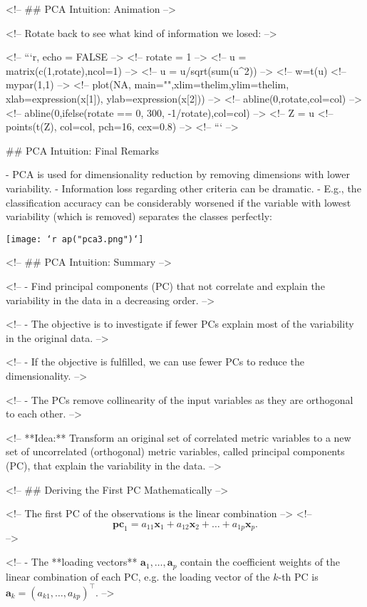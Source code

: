{{{{<!-- ## PCA Intuition: Animation -->

<!-- Rotate back to see what kind of information we losed: -->

<!-- ```{r, echo = FALSE} -->
<!-- rotate = 1 -->
<!-- u = matrix(c(1,rotate),ncol=1) -->
<!-- u = u/sqrt(sum(u^2)) -->
<!-- w=t(u)%
<!-- mypar(1,1) -->
<!-- plot(NA, main="",xlim=thelim,ylim=thelim, xlab=expression(x[1]), ylab=expression(x[2])) -->
<!-- abline(0,rotate,col=col) -->
<!-- abline(0,ifelse(rotate == 0, 300, -1/rotate),col=col) -->
<!-- Z = u%
<!-- points(t(Z), col=col, pch=16, cex=0.8) -->
<!-- ``` -->

## PCA Intuition: Final Remarks

- PCA is used for dimensionality reduction by removing dimensions with lower variability.
- Information loss regarding other criteria can be dramatic.
- E.g., the classification accuracy can be considerably worsened if the variable with lowest variability (which is removed) separates the classes perfectly:

\begin{center}
  \texttt{[image: `r ap("pca3.png")`]}
\end{center}

<!-- ## PCA Intuition: Summary -->

<!-- - Find principal components (PC) that not correlate and explain the variability in the data in a decreasing order. -->

<!-- - The objective is to investigate if fewer PCs explain most of the variability in the original data. -->

<!-- - If the objective is fulfilled, we can use fewer PCs to reduce the dimensionality. -->

<!-- - The PCs remove collinearity of the input variables as they are orthogonal to each other. -->

<!-- **Idea:** Transform an original set of correlated metric variables to a new set of uncorrelated (orthogonal) metric variables, called principal components (PC), that explain the variability in the data. -->

<!-- ## Deriving the First PC Mathematically -->

<!-- The first PC of the observations is the linear combination -->
<!-- $$\mathbf{pc}_1 = a_{11} \mathbf{x}_1 + a_{12}\mathbf{x}_2 + \hdots + a_{1p}\mathbf{x}_p.$$ -->

<!-- - The **loading vectors** $\mathbf{a}_1, \hdots, \mathbf{a}_p$ contain the coefficient weights of the linear combination of each PC, e.g. the loading vector of the $k$-th PC is $\mathbf{a}_k = (a_{k1}, \hdots, a_{kp})^\top$. -->

}}}}
